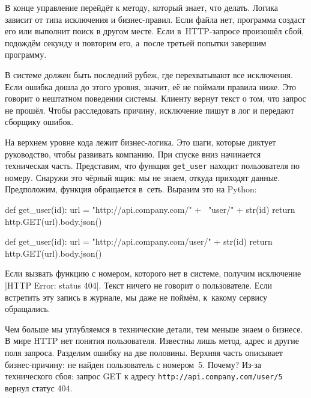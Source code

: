 В конце управление перейдёт к методу, который знает, что делать. Логика зависит
от типа исключения и бизнес-правил. Если файла нет, программа создаст его или
выполнит поиск в другом месте. Если в~HTTP-запросе произошёл сбой, подождём
секунду и повторим его, а~после третьей попытки завершим программу.

В системе должен быть последний рубеж, где перехватывают все исключения. Если
ошибка дошла до этого уровня, значит, её не поймали правила ниже. Это говорит о
нештатном поведении системы. Клиенту вернут текст о том, что запрос не
прошёл. Чтобы расследовать причину, исключение пишут в лог и передают сборщику
ошибок.

На верхнем уровне кода лежит бизнес-логика. Это шаги, которые диктует
руководство, чтобы развивать компанию. При спуске вниз начинается техническая
часть. Представим, что функция \verb|get_user| находит пользователя по
номеру. Снаружи это чёрный ящик: мы не знаем, откуда приходят
данные. Предположим, функция обращается в~сеть. Выразим это на Python:


\ifnarrow

\begin{english}
  \begin{python}
def get_user(id):
  url = "http://api.company.com/" + \
        "user/" + str(id)
  return http.GET(url).body.json()
  \end{python}
\end{english}

\else

\begin{english}
  \begin{python}
def get_user(id):
  url = "http://api.company.com/user/" + str(id)
  return http.GET(url).body.json()
  \end{python}
\end{english}

\fi

Если вызвать функцию с номером, которого нет в системе, получим исключение
\spverb|HTTP Error: status 404|. Текст ничего не говорит о пользователе. Если
встретить эту запись в журнале, мы даже не поймём, к~какому сервису обращались.

Чем больше мы углубляемся в технические детали, тем меньше знаем о бизнесе. В
мире HTTP нет понятия пользователя. Известны лишь метод, адрес и другие поля
запроса. Разделим ошибку на две половины. Верхняя часть описывает
бизнес-причину: не найден пользователь с номером~5. Почему? Из-за технического
сбоя: запрос GET к адресу \verb|http://api.company.com/user/5| вернул статус
404.

